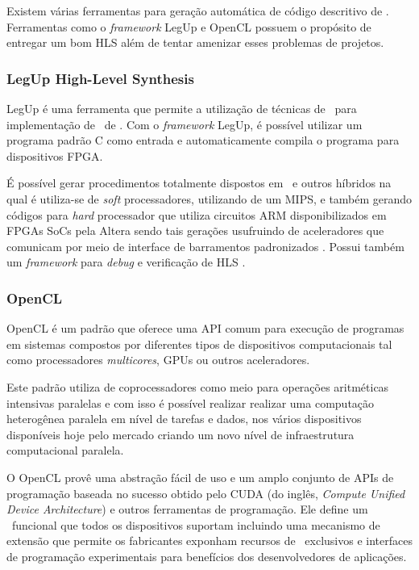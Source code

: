       Existem várias ferramentas para geração automática de código descritivo de \hardware.
      Ferramentas como o \textit{framework} LegUp e OpenCL \citep{Trevett2008} possuem o propósito de entregar um bom HLS além de tentar amenizar esses problemas de projetos.


      \subsubsection{LegUp High-Level Synthesis}
         LegUp é uma ferramenta que permite a utilização de técnicas de \software\ para implementação de \design\ de \hardware.
         Com o \textit{framework} LegUp, é possível utilizar um programa padrão  C como entrada e automaticamente compila o programa para dispositivos FPGA.

         É possível gerar procedimentos totalmente dispostos em \hardware\ e outros híbridos na qual é utiliza-se de \textit{soft} processadores, utilizando de um MIPS, e também gerando códigos para \textit{hard} processador que utiliza circuitos ARM disponibilizados em FPGAs SoCs pela Altera sendo tais gerações usufruindo de aceleradores que comunicam por meio de interface de barramentos padronizados \citep{Canis2011}.
         Possui também um \textit{framework} para \textit{debug} e verificação de HLS \citep{Fort2014}.

      \subsubsection{OpenCL}
         OpenCL é um padrão que oferece uma API comum para execução de programas em sistemas compostos por diferentes tipos de dispositivos computacionais tal como processadores \textit{multicores}, GPUs ou outros aceleradores.

         Este padrão utiliza de coprocessadores como meio para operações aritméticas intensivas paralelas e com isso é possível realizar realizar uma computação heterogênea paralela em nível de tarefas e dados, nos vários dispositivos disponíveis hoje pelo mercado criando um novo nível de infraestrutura computacional paralela.

         O OpenCL provê uma abstração fácil de uso e um amplo conjunto de APIs de programação baseada no sucesso obtido pelo CUDA (do inglês, \textit{Compute Unified Device Architecture}) e outros ferramentas de programação.
         Ele define um \core\ funcional que todos os dispositivos suportam incluindo uma mecanismo de extensão que permite os fabricantes exponham recursos de \hardware\ exclusivos e interfaces de programação experimentais para benefícios dos desenvolvedores de aplicações.

